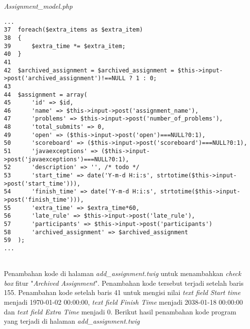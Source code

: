 \textit{Assignment\_model.php}
\begin{lstlisting}[basicstyle=\ttfamily, frame=single,
columns=fullflexible, keepspaces=true, breaklines=true]
...
37	foreach($extra_items as $extra_item)
38	{
39		$extra_time *= $extra_item;
40	}
41
42	$archived_assignment = $archived_assignment = $this->input->post('archived_assignment')!==NULL ? 1 : 0;
43
44	$assignment = array(
45		'id' => $id,
46		'name' => $this->input->post('assignment_name'),
47		'problems' => $this->input->post('number_of_problems'),
48		'total_submits' => 0,
49		'open' => ($this->input->post('open')===NULL?0:1),
50		'scoreboard' => ($this->input->post('scoreboard')===NULL?0:1),
51		'javaexceptions' => ($this->input->post('javaexceptions')===NULL?0:1),
52		'description' => '', /* todo */
53		'start_time' => date('Y-m-d H:i:s', strtotime($this->input->post('start_time'))),
54		'finish_time' => date('Y-m-d H:i:s', strtotime($this->input->post('finish_time'))),
55		'extra_time' => $extra_time*60,
56		'late_rule' => $this->input->post('late_rule'),
57		'participants' => $this->input->post('participants')
58		'archived_assignment' => $archived_assignment
59	);
...
\end{lstlisting}
~\\
Penambahan kode di halaman \textit{add\_assignment.twig} untuk menambahkan \textit{check box} fitur "\textit{Archived Assignment}". Penambahan kode tersebut  terjadi setelah baris 155. Penambahan kode setelah baris 41 untuk mengisi nilai \textit{text field Start time} menjadi 1970-01-02 00:00:00, \textit{text field Finish Time} menjadi 2038-01-18 00:00:00 dan \textit{text field Extra Time} menjadi 0. Berikut hasil penambahan kode program yang terjadi di halaman \textit{add\_assignment.twig}

